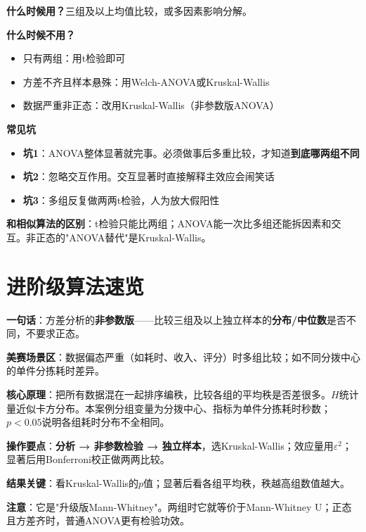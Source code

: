 \begin{algonotes}
\textbf{什么时候用？}三组及以上均值比较，或多因素影响分解。

\textbf{什么时候不用？}
\begin{itemize}
    \item 只有两组：用t检验即可
    \item 方差不齐且样本悬殊：用Welch-ANOVA或Kruskal-Wallis
    \item 数据严重非正态：改用Kruskal-Wallis（非参数版ANOVA）
\end{itemize}

\textbf{常见坑}
\begin{itemize}
    \item \textbf{坑1}：ANOVA整体显著就完事。必须做事后多重比较，才知道\textbf{到底哪两组不同}
    \item \textbf{坑2}：忽略交互作用。交互显著时直接解释主效应会闹笑话
    \item \textbf{坑3}：多组反复做两两t检验，人为放大假阳性
\end{itemize}

\textbf{和相似算法的区别}：t检验只能比两组；ANOVA能一次比多组还能拆因素和交互。非正态的"ANOVA替代"是Kruskal-Wallis。
\end{algonotes}

\section{进阶级算法速览}


\begin{algobrief}
\textbf{一句话}：方差分析的\textbf{非参数版}——比较三组及以上独立样本的\textbf{分布/中位数}是否不同，不要求正态。

\textbf{美赛场景区}：数据偏态严重（如耗时、收入、评分）时多组比较；如不同分拨中心的单件分拣耗时差异。

\textbf{核心原理}：把所有数据混在一起排序编秩，比较各组的平均秩是否差很多。$H$统计量近似卡方分布。本案例分组变量为分拨中心、指标为单件分拣耗时秒数；$p<0.05$说明各组耗时分布不全相同。

\textbf{操作要点}：\textbf{分析 → 非参数检验 → 独立样本}，选Kruskal-Wallis；效应量用$\varepsilon^2$；显著后用Bonferroni校正做两两比较。

\textbf{结果关键}：看Kruskal-Wallis的$p$值；显著后看各组平均秩，秩越高组数值越大。

\textbf{注意}：它是"升级版Mann-Whitney"。两组时它就等价于Mann-Whitney U；正态且方差齐时，普通ANOVA更有检验功效。
\end{algobrief}

